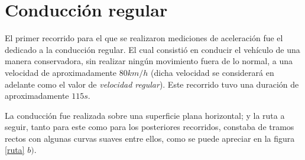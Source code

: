 \section{Conducción regular}

El primer recorrido para el que se realizaron mediciones de aceleración fue el dedicado a la conducción regular. 
El cual consistió en conducir el vehículo de una manera conservadora, sin realizar ningún movimiento fuera de lo normal, a una velocidad de aproximadamente $80 km/h$ (dicha velocidad se considerará en adelante como el valor de {\em velocidad regular}).
Este recorrido tuvo una duración de aproximadamente $115 s$. %

La conducción fue realizada sobre una superficie plana horizontal; y la ruta a seguir, tanto para este como para los posteriores recorridos, constaba de tramos rectos con algunas curvas suaves entre ellos, como se puede apreciar en la figura \ref{ruta} $b)$.\\
\pagebreak

